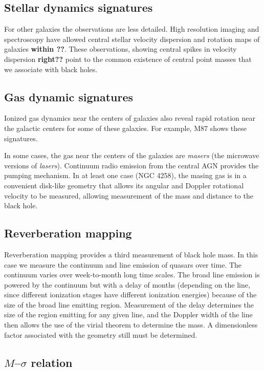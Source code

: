 \subsection{Stellar dynamics signatures}

For other galaxies the observations are less detailed. High resolution
imaging and spectroscopy have allowed central stellar velocity
dispersion and rotation maps of galaxies {\bf within ??}. These
observations, showing central spikes in velocity dispersion {\bf
right??} point to the common existence of central point masses that we
associate with black holes. 

\subsection{Gas dynamic signatures}

Ionized gas dynamics near the centers of galaxies also reveal rapid
rotation near the galactic centers for some of these galaxies. For
example, M87 shows these signatures.

In some cases, the gas near the centers of the galaxies are {\it
masers} (the microwave versions of {\it lasers}). Continuum radio
emission from the central AGN provides the pumping mechanism. In at
least one case (NGC 4258), the masing gas is in a convenient disk-like
geometry that allows its angular and Doppler rotational velocity to be
measured, allowing measurement of the mass and distance to the black
hole.

\subsection{Reverberation mapping}

Reverberation mapping provides a third measurement of black hole
mass. In this case we measure the continuum and line emission of
quasars over time. The continuum varies over week-to-month long time
scales. The broad line emission is powered by the continuum but with a
delay of months (depending on the line, since different ionization
stages have different ionization energies) because of the size of the
broad line emitting region. Measurement of the delay determines the
size of the region emitting for any given line, and the Doppler width
of the line then allows the use of the virial theorem to determine the
mass. A dimensionless factor associated with the geometry still must
be determined. 

\subsection{$M$--$\sigma$ relation}

